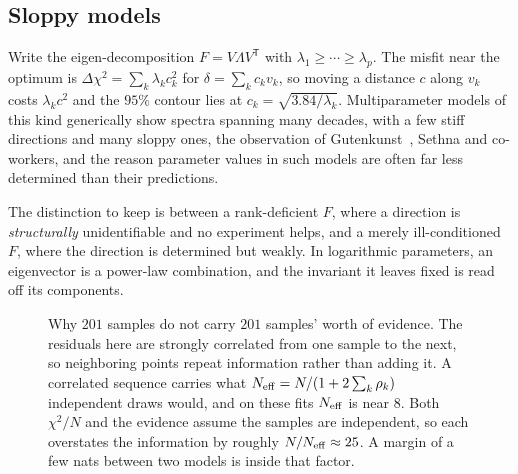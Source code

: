\documentclass[10pt]{article}
\begin{document}
\subsection{Sloppy models}
\label{sec:sloppy}

Write the eigen-decomposition $F = V\Lambda V^{\mathsf T}$ with
$\lambda_1 \ge \cdots \ge \lambda_p$. The misfit near the optimum is
$\Delta\chi^2 = \sum_k \lambda_k c_k^2$ for $\delta = \sum_k c_k v_k$, so moving a distance
$c$ along $v_k$ costs $\lambda_k c^2$ and the $95\%$ contour lies at
$c_k = \sqrt{3.84/\lambda_k}$. Multiparameter models of this kind generically show spectra
spanning many decades, with a few stiff directions and many sloppy ones, the observation
of Gutenkunst~\citep{gutenkunst2007universally}, Sethna and co-workers, and the reason parameter values in such models are
often far less determined than their predictions.

The distinction to keep is between a rank-deficient $F$, where a direction is
\emph{structurally} unidentifiable and no experiment helps, and a merely ill-conditioned
$F$, where the direction is determined but weakly. In logarithmic parameters, an eigenvector
is a power-law combination, and the invariant it leaves fixed is read off its components.


\begin{figure}[t]
\centering
{}
\caption{Why $201$ samples do not carry $201$ samples' worth of evidence. The residuals here
are strongly correlated from one sample to the next, so neighboring points repeat information
rather than adding it. A correlated sequence carries what
$N_{\rm eff}=N/(1+2\sum_k\rho_k)$ independent draws would, and on these fits $N_{\rm eff}$ is
near $8$. Both $\chi^2/N$ and the evidence assume the samples are independent, so each
overstates the information by roughly $N/N_{\rm eff}\approx25$. A margin of a few nats between
two models is inside that factor.}
\label{fig:neff}
\end{figure}
\end{document}
